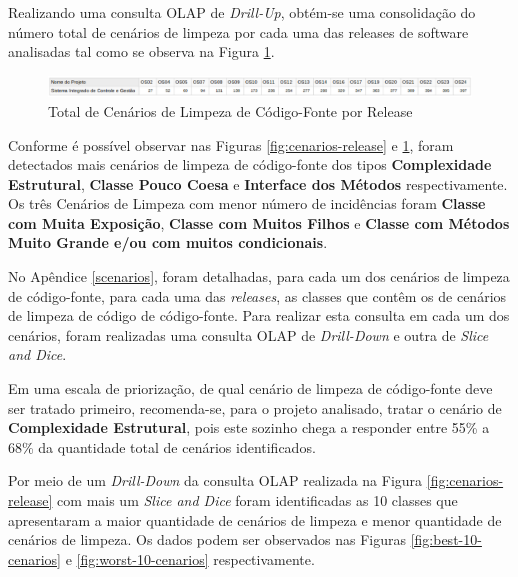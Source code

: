 Realizando uma consulta OLAP de \textit{Drill-Up}, obtém-se uma consolidação do número total de cenários de limpeza por cada uma das releases de software analisadas tal como se observa na Figura \ref{fig:cenarios-total}.

\begin{figure}[ht!]
\centering
\includegraphics[keepaspectratio=true,scale=0.48]{figuras/total-cenarios-release.eps}
\caption{Total de Cenários de Limpeza de Código-Fonte por Release}
\label{fig:cenarios-total}
\end{figure}
\FloatBarrier

Conforme é possível observar nas Figuras \ref{fig:cenarios-release} e \ref{fig:cenarios-total}, foram detectados mais cenários de limpeza de código-fonte dos tipos \textbf{Complexidade Estrutural}, \textbf{Classe Pouco Coesa} e \textbf{Interface dos Métodos} respectivamente. Os três Cenários de Limpeza com menor número de incidências foram \textbf{Classe com Muita Exposição}, \textbf{Classe com Muitos Filhos} e \textbf{Classe com Métodos Muito Grande e/ou com muitos condicionais}.

No Apêndice \ref{scenarios}, foram detalhadas, para cada um dos cenários de limpeza de código-fonte, para cada uma das \textit{releases}, as classes que contêm os de cenários de limpeza de código de código-fonte. Para realizar esta consulta em cada um dos cenários, foram realizadas uma consulta OLAP de \textit{Drill-Down} e outra de \textit{Slice and Dice}.

Em uma escala de priorização, de qual cenário de limpeza de código-fonte deve ser tratado primeiro, recomenda-se, para o projeto analisado, tratar o cenário de \textbf{Complexidade Estrutural}, pois este sozinho chega a responder entre 55\% a 68\% da quantidade total de cenários identificados. 

Por meio de um \textit{Drill-Down} da consulta OLAP realizada na Figura \ref{fig:cenarios-release} com mais um \textit{Slice and Dice} foram identificadas as 10 classes que apresentaram a maior quantidade de cenários de limpeza e menor quantidade de cenários de limpeza. Os dados podem ser observados nas Figuras \ref{fig:best-10-cenarios} e \ref{fig:worst-10-cenarios} respectivamente.


